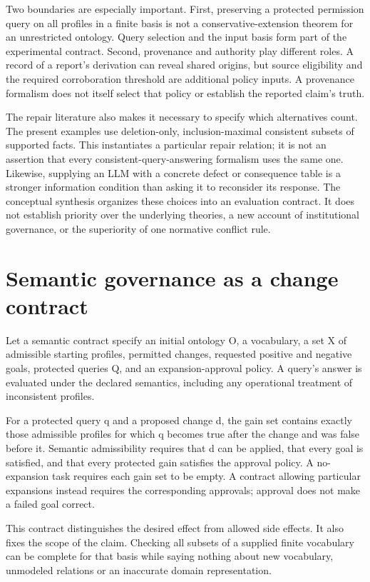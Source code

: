 \documentclass[a4paper,preprint,12pt,numbers,nopreprintline]{elsarticle}
\begin{document}
Two boundaries are especially important. First, preserving a protected permission query on all profiles in a finite basis is not a conservative-extension theorem for an unrestricted ontology. Query selection and the input basis form part of the experimental contract. Second, provenance and authority play different roles. A record of a report's derivation can reveal shared origins, but source eligibility and the required corroboration threshold are additional policy inputs. A provenance formalism does not itself select that policy or establish the reported claim's truth.

The repair literature also makes it necessary to specify which alternatives count. The present examples use deletion-only, inclusion-maximal consistent subsets of supported facts. This instantiates a particular repair relation; it is not an assertion that every consistent-query-answering formalism uses the same one. Likewise, supplying an LLM with a concrete defect or consequence table is a stronger information condition than asking it to reconsider its response. The conceptual synthesis organizes these choices into an evaluation contract. It does not establish priority over the underlying theories, a new account of institutional governance, or the superiority of one normative conflict rule.

\section{Semantic governance as a change contract}

Let a semantic contract specify an initial ontology O, a vocabulary, a set X of admissible starting profiles, permitted changes, requested positive and negative goals, protected queries Q, and an expansion-approval policy. A query's answer is evaluated under the declared semantics, including any operational treatment of inconsistent profiles.

For a protected query q and a proposed change d, the gain set contains exactly those admissible profiles for which q becomes true after the change and was false before it. Semantic admissibility requires that d can be applied, that every goal is satisfied, and that every protected gain satisfies the approval policy. A no-expansion task requires each gain set to be empty. A contract allowing particular expansions instead requires the corresponding approvals; approval does not make a failed goal correct.


This contract distinguishes the desired effect from allowed side effects. It also fixes the scope of the claim. Checking all subsets of a supplied finite vocabulary can be complete for that basis while saying nothing about new vocabulary, unmodeled relations or an inaccurate domain representation.
\end{document}
